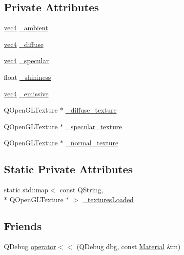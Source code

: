 \subsection*{Private Attributes}
\begin{DoxyCompactItemize}
\item 
\hyperlink{structvec4}{vec4} \hyperlink{class_material_a8631fe4ccaea32b5f83d618490ed1a94}{\+\_\+ambient}
\item 
\hyperlink{structvec4}{vec4} \hyperlink{class_material_ac6d5a21fb938c37d981ff904baa139ce}{\+\_\+diffuse}
\item 
\hyperlink{structvec4}{vec4} \hyperlink{class_material_aa86eef19901a701e22ef3ddd7b9c8ec2}{\+\_\+specular}
\item 
float \hyperlink{class_material_ae3f666b9de93b770232ebb5b1b3ee47e}{\+\_\+shininess}
\item 
\hyperlink{structvec4}{vec4} \hyperlink{class_material_a48f498add75d2e7b0022b3f34271e22b}{\+\_\+emissive}
\item 
Q\+Open\+G\+L\+Texture $\ast$ \hyperlink{class_material_a522d07896a1363e987d09d8e4b66c156}{\+\_\+diffuse\+\_\+texture}
\item 
Q\+Open\+G\+L\+Texture $\ast$ \hyperlink{class_material_a15711d6d794b6ea122e38738fa73ba8a}{\+\_\+specular\+\_\+texture}
\item 
Q\+Open\+G\+L\+Texture $\ast$ \hyperlink{class_material_add78622071d92485dd37dbd1934453b3}{\+\_\+normal\+\_\+texture}
\end{DoxyCompactItemize}
\subsection*{Static Private Attributes}
\begin{DoxyCompactItemize}
\item 
static std\+::map$<$ const Q\+String, \\*
Q\+Open\+G\+L\+Texture $\ast$ $>$ \hyperlink{class_material_a9ccbb6b22b224284050b4d6c172829fc}{\+\_\+textures\+Loaded}
\end{DoxyCompactItemize}
\subsection*{Friends}
\begin{DoxyCompactItemize}
\item 
Q\+Debug \hyperlink{class_material_a6796ee577479f67459444fcd552e6c05}{operator$<$$<$} (Q\+Debug dbg, const \hyperlink{class_material}{Material} \&m)
\end{DoxyCompactItemize}



